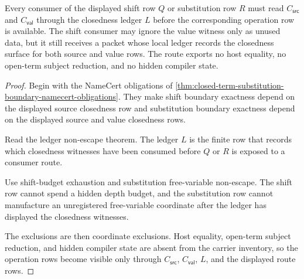 \begin{theorem}
\label{thm:closed-term-substitution-boundary-closedness-ledger-coverage}
Every consumer of the displayed shift row $Q$ or substitution row $R$ must read $C_{\mathsf{src}}$ and $C_{\mathsf{val}}$ through the closedness ledger $L$ before the corresponding operation row is available. The shift consumer may ignore the value witness only as unused data, but it still receives a packet whose local ledger records the closedness surface for both source and value rows. The route exports no host equality, no open-term subject reduction, and no hidden compiler state.
\end{theorem}
\begin{proof}
Begin with the NameCert obligations of \autoref{thm:closed-term-substitution-boundary-namecert-obligations}. They make shift boundary exactness depend on the displayed source closedness row and substitution boundary exactness depend on the displayed source and value closedness rows.

Read the ledger non-escape theorem. The ledger $L$ is the finite row that records which closedness witnesses have been consumed before $Q$ or $R$ is exposed to a consumer route.

Use shift-budget exhaustion and substitution free-variable non-escape. The shift row cannot spend a hidden depth budget, and the substitution row cannot manufacture an unregistered free-variable coordinate after the ledger has displayed the closedness witnesses.

The exclusions are then coordinate exclusions. Host equality, open-term subject reduction, and hidden compiler state are absent from the carrier inventory, so the operation rows become visible only through $C_{\mathsf{src}}$, $C_{\mathsf{val}}$, $L$, and the displayed route rows.
\end{proof}

